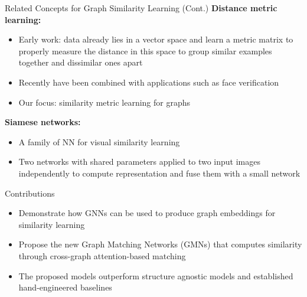 \documentclass{beamer}
\begin{document}
\begin{frame}{Related Concepts for Graph Similarity Learning (Cont.)}
\textbf{Distance metric learning:}
\begin{itemize}
    \item Early work: data already lies in a vector space and learn a metric matrix to properly measure the distance in this space to group similar examples together and dissimilar ones apart
    \item Recently have been combined with applications such as face verification
    \item Our focus: similarity metric learning for graphs
\end{itemize}

\textbf{Siamese networks:}
\begin{itemize}
    \item A family of NN for visual similarity learning
    \item Two networks with shared parameters applied to two input images independently to compute representation and fuse them with a small network
\end{itemize}
\end{frame}


\begin{frame}{Contributions}
\begin{itemize}
    \item Demonstrate how GNNs can be used to produce graph embeddings for similarity learning
    \item Propose the new Graph Matching Networks (GMNs) that computes similarity through cross-graph attention-based matching
    \item The proposed models outperform structure agnostic models and established hand-engineered baselines
\end{itemize}
\end{frame}
\end{document}
